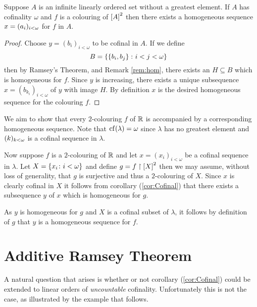 \begin{cor}\label{cor:Cofinal}
	Suppose $A$ is an infinite linearly ordered set without a greatest element.
	If $A$ has cofinality $\omega$ and $f$ is a colouring of $\subsets{2}{A}$
	then there exists a homogeneous sequence $x=\family{a_i}{i<\omega}$ for $f$
	in $A$.
\end{cor}

\begin{proof}
	Choose $y=(b_i)_{i<\omega}$ to be cofinal in $A$.  If we define
	\begin{equation}
		B=\setbuild{\set{b_i,b_j}}{i<j<\omega}
	\end{equation}
	then by Ramsey's Theorem, and Remark \ref{rem:hom}, there exists an
	$H\subseteq B$ which is homogeneous for $f$.  Since $y$ is increasing,
	there exists a unique subsequence $x=(b_{k_i})_{i<\omega}$ of $y$ with
	image $H$.  By definition $x$ is the desired homogeneous sequence for the
	colouring $f$.
\end{proof}

\begin{exm}

	We aim to show that every $2$-colouring $f$ of $\reals$ is accompanied by a
	corresponding homogeneous sequence.  Note that $\cf(\lambda)=\omega$ since
	$\lambda$ has no greatest element and $\family{k}{k<\omega}$ is a cofinal
	sequence in $\lambda$.

	Now suppose $f$ is a $2$-colouring of $\reals$ and let $x=(x_i)_{i<\omega}$
	be a cofinal sequence in $\lambda$.  Let $X=\setbuild{x_i}{i<\omega}$ and
	define $g=f\restriction \subsets{2}{X}$ then we may assume, without loss of
	generality, that $g$ is surjective and thus a $2$-colouring of $X$.  Since
	$x$ is clearly cofinal in $X$ it follows from corollary (\ref{cor:Cofinal})
	that there exists a subsequence $y$ of $x$ which is homogeneous for $g$.

	As $y$ is homogeneous for $g$ and $X$ is a cofinal subset of $\lambda$, it
	follows by definition of $g$ that $y$ is a homogeneous sequence for $f$.

\end{exm}


\section{Additive Ramsey Theorem}

A natural question that arises is whether or not corollary (\ref{cor:Cofinal})
could be extended to linear orders of \textit{uncountable} cofinality.
Unfortunately this is not the case, as illustrated by the example that follows.


